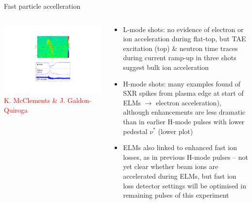 \documentclass[10pt, compress]{beamer}
\newcommand\Fontvi{\fontsize{8}{7.2}\selectfont}
\begin{document}
\begin{frame}{Fast particle accelleration}
  \Fontvi
  \begin{columns}
    \begin{column}{0.4\textwidth}
      \includegraphics[width=\textwidth]{../../Experiments/AUG/analysis/pdfbox/KenAnalysis} \\
      \textcolor{red}{K. McClements \& J. Galdon-Quiroga}
    \end{column}
    \begin{column}{0.6\textwidth}
    \begin{itemize}
\item L-mode shots: no evidence of electron or ion acceleration during flat-top, but TAE excitation (top) \&
  neutron time traces during current ramp-up in three shots suggest bulk ion acceleration
\item H-mode shots: many examples found of SXR spikes from plasma edge at start of ELMs $\rightarrow$ electron acceleration),
  although enhancements are less dramatic than in earlier H-mode pulses with lower pedestal $\nu^{*}$ (lower plot)
\item ELMs also linked to enhanced fast ion losses, as in previous H-mode pulses –
  not yet clear whether beam ions are accelerated during ELMs, but fast ion loss detector settings will be optimised in remaining pulses of this experiment
\end{itemize}
\end{column}
\end{columns}
\end{frame}
\end{document}
